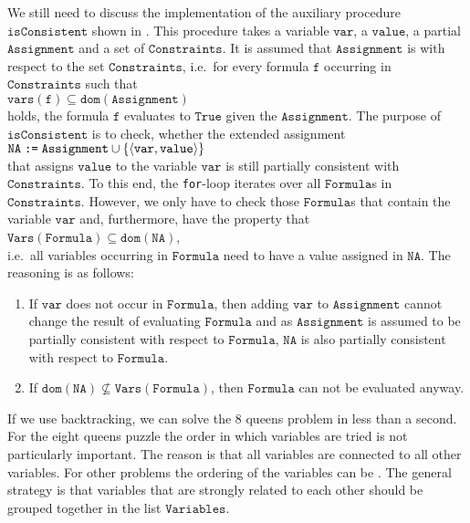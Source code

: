 We still need to discuss the implementation of the auxiliary procedure $\texttt{isConsistent}$
shown in .  This procedure takes a variable $\texttt{var}$, a $\texttt{value}$, a partial 
$\texttt{Assignment}$ and a set of $\texttt{Constraints}$.  It is assumed that $\texttt{Assignment}$ is
 with respect to the set $\texttt{Constraints}$, i.e.~for every formula $\texttt{f}$
occurring in $\texttt{Constraints}$ such that
\\[0.2cm]
\hspace*{1.3cm}
$\texttt{vars}(\texttt{f}) \subseteq \texttt{dom}(\texttt{Assignment})$
\\[0.2cm]
holds, the formula $\texttt{f}$ evaluates to $\texttt{True}$ given the $\texttt{Assignment}$.  The purpose of
$\texttt{isConsistent}$ is to check, whether the extended assignment
\\[0.2cm]
\hspace*{1.3cm}
$\texttt{NA} \;\texttt{:=}\;\texttt{Assignment} \cup \{ \pair(\texttt{var}, \texttt{value}) \}$
\\[0.2cm]
that assigns $\texttt{value}$ to the variable $\texttt{var}$ is still partially consistent with $\texttt{Constraints}$. 
To this end, the \texttt{for}-loop iterates over all $\texttt{Formula}$s in $\texttt{Constraints}$. 
However, we only have to check those $\texttt{Formula}$s that contain the variable $\texttt{var}$ and,
furthermore, have the property that
\\[0.2cm]
\hspace*{1.3cm}
$\texttt{Vars}(\texttt{Formula}) \subseteq \texttt{dom}(\texttt{NA})$,
\\[0.2cm]
i.e.~all variables occurring in $\texttt{Formula}$ need to have a value assigned in
$\texttt{NA}$.  The reasoning is as follows:
\begin{enumerate}
\item If $\texttt{var}$ does not occur in $\texttt{Formula}$, then adding $\texttt{var}$ to
      $\texttt{Assignment}$ cannot change the result of evaluating $\texttt{Formula}$ and as
      $\texttt{Assignment}$ is assumed to be partially consistent with respect to $\texttt{Formula}$, 
      $\texttt{NA}$ is also partially consistent with respect to $\texttt{Formula}$.
\item If $\texttt{dom}(\texttt{NA}) \not\subseteq \texttt{Vars}(\texttt{Formula})$, then $\texttt{Formula}$ can not be evaluated anyway. 
\end{enumerate}
If we use backtracking, we can solve the 8 queens problem in less than a second.
For the eight queens puzzle the order in which variables are tried is not particularly important.  The reason
is that all variables are connected to all other variables.  For other problems the ordering of the variables
can be .  The general strategy is that variables that are strongly related to each other should
be grouped together in the list $\texttt{Variables}$.



